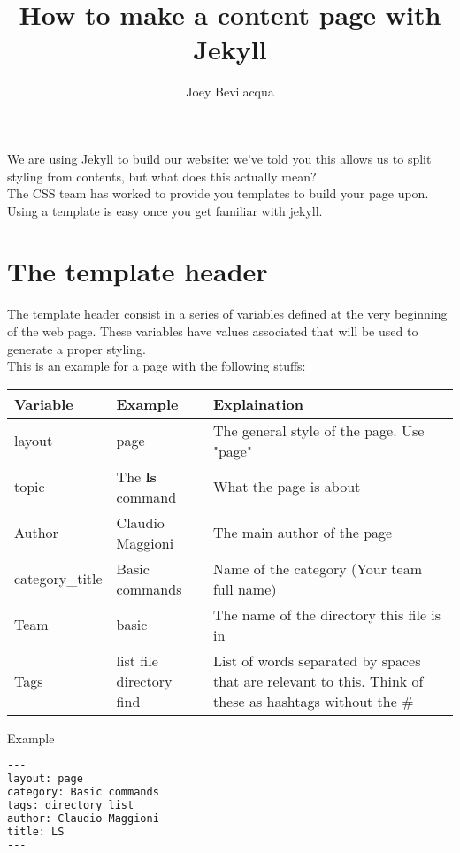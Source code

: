 \documentclass[hidelinks,12pt,a4paper,numbers=enddot]{scrartcl}
\title{How to make a content page with Jekyll}
\author{Joey Bevilacqua}
\begin{document}
\maketitle

We are using Jekyll to build our website: we've told you this allows us to split
styling from contents, but what does this actually mean?\\

The CSS team has worked to provide you templates to build your page upon.\\

Using a template is easy once you get familiar with jekyll.

\section{The template header}

The template header consist in a series of variables defined at the very beginning
of the web page. These variables have values associated that will be used
to generate a proper styling.\\

This is an example for a page with the following stuffs:

\begin{table}[h]
\begin{tabular}{l l p{5cm}}
\textbf{Variable} & \textbf{Example} & \textbf{Explaination}\\\hline
layout & page & The general style of the page. Use "page"\\
topic & The \textbf{ls} command & What the page is about\\
Author & Claudio Maggioni & The main author of the page\\
category\_title & Basic commands & Name of the category (Your team full name)\\
Team & basic & The name of the directory this file is in\\
Tags & list file directory find & List of words separated by spaces that are relevant to this. Think of these as hashtags without the \#\\
\end{tabular}
\end{table}

Example

\begin{lstlisting}[language=html]
---
layout: page
category: Basic commands
tags: directory list
author: Claudio Maggioni
title: LS
---
\end{lstlisting}
\end{document}
